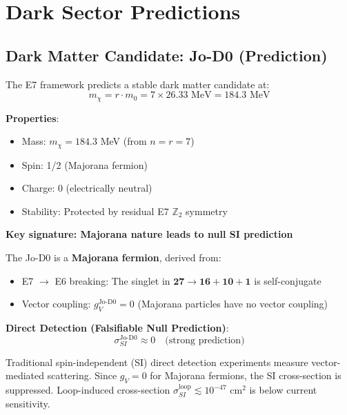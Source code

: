 \documentclass[11pt,a4paper]{article}
\begin{document}
\section{Dark Sector Predictions}

\subsection{Dark Matter Candidate: Jo-D0 (Prediction)}

The E7 framework predicts a stable dark matter candidate at:
\begin{equation}
m_\chi = r \cdot m_0 = 7 \times 26.33 \text{ MeV} = 184.3 \text{ MeV}
\end{equation}

\textbf{Properties}:
\begin{itemize}
\item Mass: $m_\chi = 184.3$ MeV (from $n = r = 7$)
\item Spin: 1/2 (Majorana fermion)
\item Charge: 0 (electrically neutral)
\item Stability: Protected by residual E7 $\mathbb{Z}_2$ symmetry
\end{itemize}

\textbf{Key signature: Majorana nature leads to null SI prediction}

The Jo-D0 is a \textbf{Majorana fermion}, derived from:
\begin{itemize}
\item E7 $\to$ E6 breaking: The singlet in $\mathbf{27} \to \mathbf{16} + \mathbf{10} + \mathbf{1}$ is self-conjugate
\item Vector coupling: $g_V^{\text{Jo-D0}} = 0$ (Majorana particles have no vector coupling)
\end{itemize}

\textbf{Direct Detection (Falsifiable Null Prediction)}:
\begin{equation}
\boxed{\sigma_{SI}^{\text{Jo-D0}} \approx 0 \quad \text{(strong prediction)}}
\end{equation}

Traditional spin-independent (SI) direct detection experiments measure vector-mediated scattering. Since $g_V = 0$ for Majorana fermions, the SI cross-section is suppressed. Loop-induced cross-section $\sigma_{SI}^{\text{loop}} \lesssim 10^{-47}$ cm$^2$ is below current sensitivity.
\end{document}
